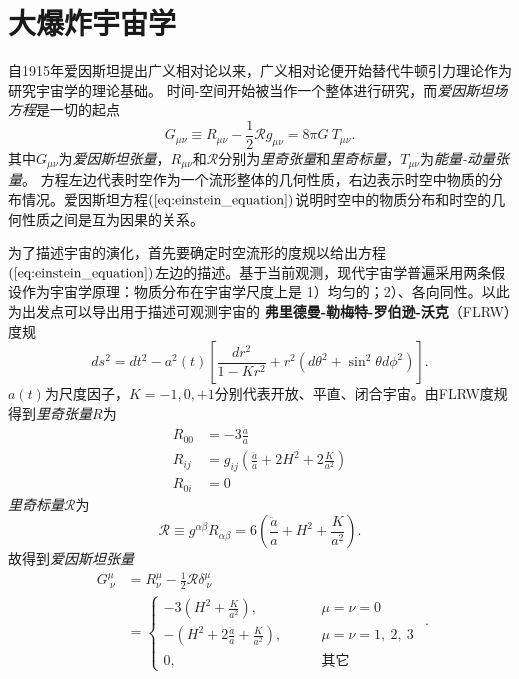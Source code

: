 \section{大爆炸宇宙学}
自1915年爱因斯坦提出广义相对论以来，广义相对论便开始替代牛顿引力理论作为研究宇宙学的理论基础。
时间-空间开始被当作一个整体进行研究，而\textit{爱因斯坦场方程}是一切的起点
\begin{equation}
    \label{eq:einstein_equation}
    G_{\mu\nu}\equiv R_{\mu\nu}-\frac{1}{2}\mathcal{R}g_{\mu\nu}=8\pi G\ T_{\mu\nu}.
\end{equation}
其中$G_{\mu\nu}$为\textit{爱因斯坦张量}，$R_{\mu\nu}$和$\mathcal{R}$分别为\textit{里奇张量}和\textit{里奇标量}，$T_{\mu\nu}$为\textit{能量-动量张量}。
方程左边代表时空作为一个流形整体的几何性质，右边表示时空中物质的分布情况。爱因斯坦方程$(\ref{eq:einstein_equation})$说明时空中的物质分布和时空的几何性质之间是互为因果的关系。

为了描述宇宙的演化，首先要确定时空流形的度规以给出方程$(\ref{eq:einstein_equation})$左边的描述。基于当前观测，现代宇宙学普遍采用两条假设作为宇宙学原理：物质分布在宇宙学尺度上是
1）均匀的；2）、各向同性。以此为出发点可以导出用于描述可观测宇宙的
\textbf{弗里德曼-勒梅特-罗伯逊-沃克}（FLRW）度规
\begin{equation}\label{eq:frw_metric}
    ds^2=dt^2-a^2(t)\left[\frac{dr^2}{1-Kr^2}+r^2\left(d\theta^2+\sin^2\theta
    d\phi^2\right)\right].
\end{equation}
$a(t)$为尺度因子，$K=-1, 0,
+1$分别代表开放、平直、闭合宇宙。由FLRW度规得到\textit{里奇张量}$R$为
\begin{equation}
    \begin{split}
        R_{00} &= -3\frac{\ddot{a}}{a} \\
        R_{ij} &= g_{ij}\left(\frac{\ddot{a}}{a}+2H^2+2\frac{K}{a^2}\right) \\
        R_{0i} &= 0
    \end{split}
\end{equation}
\textit{里奇标量}$\mathcal{R}$为
\begin{equation}
    \label{eq:ricci_scalar}
    \mathcal{R} \equiv g^{\alpha\beta}R_{\alpha\beta} =
    6\left(\frac{\ddot{a}}{a}+H^2+\frac{K}{a^2}\right).
\end{equation}
故得到\textit{爱因斯坦张量}
\begin{equation}
    \label{eq:einstein_tensor}
    \begin{split}
        G^{\mu}_{\ \nu} &= R^{\mu}_{\nu} -
        \frac{1}{2}\mathcal{R}\delta^{\mu}_{\ \nu}\\
        &=
        \begin{cases}
            -3(H^2 + \frac{K}{a^2}),\qquad &\mu=\nu=0 \\
            -(H^2+2\frac{\ddot{a}}{a}+\frac{K}{a^2}),\qquad
            &\mu=\nu=1,\ 2,\ 3 \\
            0,\qquad &\text{其它}
        \end{cases}
    \end{split}.
\end{equation}

